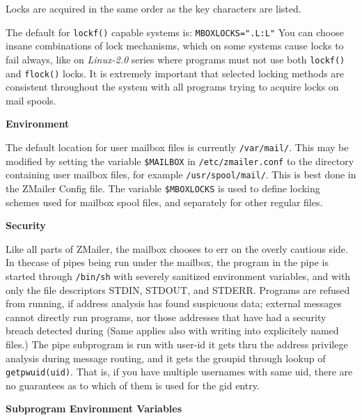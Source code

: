 Locks are acquired in the same order as the key characters are listed.

The default for {\tt lockf()} capable systems is: {\tt MBOXLOCKS=".L:L"}
You can choose insane combinations of lock mechanisms, which on
some systems cause locks to fail always, like on {\em Linux-2.0} series
where programs must not use both {\tt lockf()} and {\tt flock()} locks.
It is extremely important that selected locking methods are consistent
throughout the system with all programs trying to acquire locks on
mail spools.

{\bf Environment}

The default location for user mailbox files is 
currently {\tt /var/mail/}. This may be modified by setting the variable
{\tt \$MAILBOX} in {\tt /etc/zmailer.conf} to the directory containing 
user mailbox files, for example {\tt /usr/spool/mail/}. This is best done 
in the ZMailer Config file. The variable {\tt \$MBOXLOCKS} is used to define locking schemes used for
mailbox spool files, and separately for other regular files.

{\bf Security}

Like all parts of ZMailer, the mailbox chooses to
err on the overly cautious side.  In thecase of pipes being run under
the mailbox, the program in the pipe is started through {\tt /bin/sh} with
severely sanitized environment variables, and with only the file
descriptors STDIN, STDOUT, and STDERR. Programs are refused from
running, if address analysis has found suspicuous data; external
messages cannot directly run programs, nor those addresses that
have had a security breach detected during (Same applies also
with writing into explicitely named files.)
The pipe subprogram is run with user-id it gets thru the address
privilege analysis during message routing, and it gets the groupid 
through lookup of {\tt getpwuid(uid)}. That is, if you have multiple
usernames with same uid, there are no guarantees as to which of
them is used for the gid entry.

{\bf Subprogram Environment Variables}

